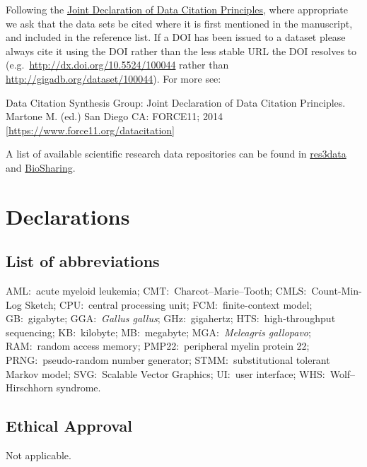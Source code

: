 \documentclass[a4paper,num-refs]{oup-contemporary}
\begin{document}
Following the \href{https://www.force11.org/group/joint-declaration-data-citation-principles-final}{Joint Declaration of Data Citation Principles}, where appropriate we ask that the data sets be cited where it is first mentioned in the manuscript, and included in the reference list. If a DOI has been issued to a dataset please always cite it using the DOI rather than the less stable URL the DOI resolves to (e.g.~\url{http://dx.doi.org/10.5524/100044} rather than \url{http://gigadb.org/dataset/100044}). For more see:

Data Citation Synthesis Group: Joint Declaration of Data Citation Principles. Martone M. (ed.) San Diego CA: FORCE11; 2014 [\url{https://www.force11.org/datacitation}]

A list of available scientific research data repositories can be found in \href{http://www.re3data.org/}{res3data} and \href{https://biosharing.org/}{BioSharing}.

\section{Declarations}

\subsection{List of abbreviations}
AML:~acute myeloid leukemia; CMT:~Charcot–Marie–Tooth; CMLS:~Count-Min-Log Sketch; CPU:~central processing unit; FCM:~finite-context model; GB:~gigabyte; GGA:~\textit{Gallus gallus}; GHz:~gigahertz; HTS:~high-throughput sequencing; KB:~kilobyte; MB:~megabyte; MGA:~\textit{Meleagris gallopavo}; RAM:~random access memory; PMP22:~peripheral myelin protein 22; PRNG:~pseudo-random number generator; STMM:~substitutional tolerant Markov model; SVG:~Scalable Vector Graphics; UI:~user interface; WHS:~Wolf–Hirschhorn syndrome.

\subsection{Ethical Approval}
Not applicable.


\end{document}
